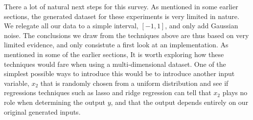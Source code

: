 \documentclass[11pt,conference]{IEEEtran}
\begin{document}
There a lot of natural next steps for this survey. As mentioned in some earlier sections, the generated dataset for these experiments is very limited in nature. We relegate all our data to a simple interval, $[-1, 1]$, and only add Gaussian noise. The conclusions we draw from the techniques above are thus based on very limited evidence, and only consistute a first look at an implementation. As mentioned in some of the earlier sections, It is worth exploring how these techniques would fare when using a multi-dimensional dataset. One of the simplest possible ways to introduce this would be to introduce another input variable, $x_2$ that is randomly chosen from a uniform distribution and see if regressions techniques such as lasso and ridge regression can tell that $x_2$ plays no role when determining the output $y$, and that the output depends entirely on our original generated inputs.


\color{black}
\end{document}
